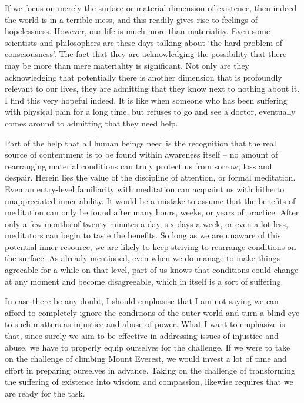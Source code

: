 If we focus on merely the surface or material dimension of existence,
then indeed the world is in a terrible mess, and this readily gives rise
to feelings of hopelessness. However, our life is much more than
materiality. Even some scientists and philosophers are these days
talking about `the hard problem of consciousness'. The fact that they
are acknowledging the possibility that there may be more than mere
materiality is significant. Not only are they acknowledging that
potentially there is another dimension that is profoundly relevant to
our lives, they are admitting that they know next to nothing about it. I
find this very hopeful indeed. It is like when someone who has been
suffering with physical pain for a long time, but refuses to go and see
a doctor, eventually comes around to admitting that they need help.

Part of the help that all human beings need is the recognition that the
real source of contentment is to be found within awareness itself -- no
amount of rearranging material conditions can truly protect us from
sorrow, loss and despair. Herein lies the value of the discipline of
attention, or formal meditation. Even an entry-level familiarity with
meditation can acquaint us with hitherto unappreciated inner ability. It
would be a mistake to assume that the benefits of meditation can only be
found after many hours, weeks, or years of practice. After only a few
months of twenty-minutes-a-day, six days a week, or even a lot less,
meditators can begin to taste the benefits. So long as we are unaware of
this potential inner resource, we are likely to keep striving to
rearrange conditions on the surface. As already mentioned, even when we
do manage to make things agreeable for a while on that level, part of us
knows that conditions could change at any moment and become
disagreeable, which in itself is a sort of suffering.

In case there be any doubt, I should emphasise that I am not saying we
can afford to completely ignore the conditions of the outer world and
turn a blind eye to such matters as injustice and abuse of power. What I
want to emphasize is that, since surely we aim to be effective in
addressing issues of injustice and abuse, we have to properly equip
ourselves for the challenge. If we were to take on the challenge of
climbing Mount Everest, we would invest a lot of time and effort in
preparing ourselves in advance. Taking on the challenge of transforming
the suffering of existence into wisdom and compassion, likewise requires
that we are ready for the task.

